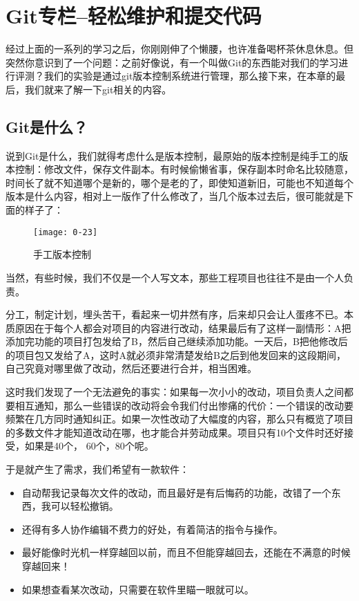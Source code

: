 \section{Git专栏--轻松维护和提交代码}
经过上面的一系列的学习之后，你刚刚伸了个懒腰，也许准备喝杯茶休息休息。但突然你意识到了一个问题：之前好像说，有一个叫做Git的东西能对我们的学习进行评测？我们的实验是通过git版本控制系统进行管理，那么接下来，在本章的最后，我们就来了解一下git相关的内容。
\subsection{Git是什么？}
说到Git是什么，我们就得考虑什么是版本控制，最原始的版本控制是纯手工的版本控制：修改文件，保存文件副本。有时候偷懒省事，保存副本时命名比较随意，时间长了就不知道哪个是新的，哪个是老的了，即使知道新旧，可能也不知道每个版本是什么内容，相对上一版作了什么修改了，当几个版本过去后，很可能就是下面的样子了：
\begin{figure}[htbp]
  \centering
  \texttt{[image: 0-23]}
  \caption{手工版本控制}\label{fig:0-23}
\end{figure}

当然，有些时候，我们不仅是一个人写文本，那些工程项目也往往不是由一个人负责。

分工，制定计划，埋头苦干，看起来一切井然有序，后来却只会让人蛋疼不已。本质原因在于每个人都会对项目的内容进行改动，结果最后有了这样一副情形：A把添加完功能的项目打包发给了B，然后自己继续添加功能。一天后，B把他修改后的项目包又发给了A，这时A就必须非常清楚发给B之后到他发回来的这段期间，自己究竟对哪里做了改动，然后还要进行合并，相当困难。

这时我们发现了一个无法避免的事实：如果每一次小小的改动，项目负责人之间都要相互通知，那么一些错误的改动将会令我们付出惨痛的代价：一个错误的改动要频繁在几方同时通知纠正。如果一次性改动了大幅度的内容，那么只有概览了项目的多数文件才能知道改动在哪，也才能合并劳动成果。项目只有10个文件时还好接受，如果是40个， 60个，80个呢。

于是就产生了需求，我们希望有一款软件：
\begin{itemize}
    \item 自动帮我记录每次文件的改动，而且最好是有后悔药的功能，改错了一个东西，我可以轻松撤销。
	\item 还得有多人协作编辑不费力的好处，有着简洁的指令与操作。
	\item 最好能像时光机一样穿越回以前，而且不但能穿越回去，还能在不满意的时候穿越回来！
	\item 如果想查看某次改动，只需要在软件里瞄一眼就可以。
\end{itemize}

